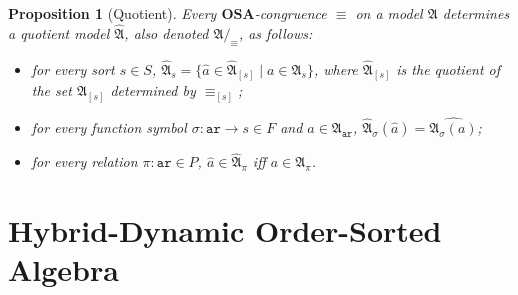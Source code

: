 \documentclass{article}
\newtheorem{proposition}[definition]{Proposition}
\newcommand{\OSA}{{\mathbf{OSA}}}
\newcommand{\A}{\mathfrak{A}}
\newcommand{\ari}{\mathtt{ar}}
\begin{document}
\begin{proposition}[Quotient]
  \label{prop:OSMA-quotient}
  Every \(\OSA\)-congruence \( \equiv\) on a model \( \A \) determines a \emph{quotient model} \(\widehat{\A}\), also denoted \(\A/_\equiv\), as follows:
  \begin{itemize}
  \item for every sort \(s \in S\), \(\widehat{\A}_{s} = \{\widehat{a} \in \widehat{\A}_{[s]} \mid a \in \A_{s}\}\), where \(\widehat{\A}_{[s]}\) is the quotient of the set \(\A_{[s]}\) determined by \(\equiv_{[s]}\);
  
  
  \item for every function symbol \(\sigma \colon \ari \to s\in F\) and \(a \in \A_{\ari}\), \(\widehat{\A}_{\sigma}(\widehat{a}) = \widehat{\A_{\sigma}(a)}\);
  
  \item for every relation \(\pi \colon \ari\in P\), \(\widehat{a} \in \widehat{\A}_{\pi}\) iff \(a \in \A_{\pi}\).
  
  \end{itemize}
\end{proposition}

\section{Hybrid-Dynamic Order-Sorted Algebra}


\end{document}
